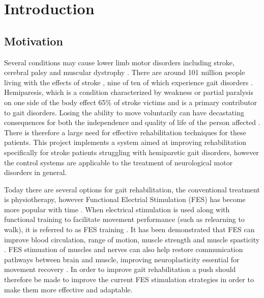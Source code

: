 
\section{Introduction }


\subsection{Motivation}

Several conditions may cause lower limb motor disorders including stroke, cerebral palsy and muscular dystrophy \cite{hayami_development_2022}. There are around 101 million people living with the effects of stroke \cite{noauthor_key_nodate}, nine of ten of which experience gait disorders \cite{schaechter_motor_2004}. Hemiparesis, which is a condition characterized by weakness or partial paralysis on one side of the body effect 65\% of stroke victims \cite{wist_muscle_2016} and is a primary contributor to gait disorders. Losing the ability to move voluntarily can have decastating consequences for both the independence and quality of life of the person affected \cite{marquez-chin_functional_2020}. There is therefore a large need for effective rehabilitation techniques for these patients. This project implements a system aimed at improving rehabilitation specifically for stroke patients struggling with hemiparetic gait disorders, however the control systems are applicable to the treatment of neurological motor disorders in general.

Today there are several options for gait rehabilitation, the conventional treatment is physiotherapy, however Functional Electrial Stimulation (FES) has become more popular with time \cite{muller_adaptive_2020}. When electrical stimulation is used along with functional training to facilitate movement performance (such as relearning to walk), it is referred to as FES training \cite{hayami_development_2022}. It has been demonstrated that FES can improve blood circulation, range of motion, muscle strength and muscle spasticity \cite{luo_review_2020}. FES stimuation of muscles and nerves can also help restore communication pathways between brain and muscle, improving neuroplasticity essential for movement recovery \cite{marquez-chin_functional_2020}. In order to improve gait rehabilitation a push should therefore be made to improve the current FES stimulation strategies in order to make them more effective and adaptable.

